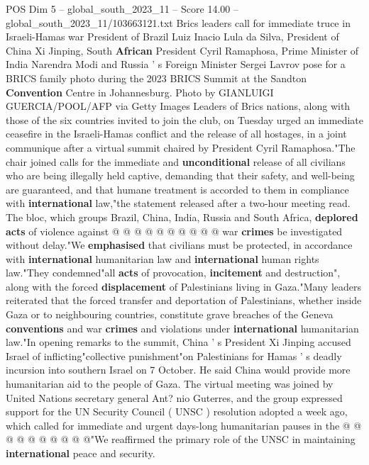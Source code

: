 \begin{textsample}{POS Dim 5 – global\_south\_2023\_11 – Score 14.00 – global\_south\_2023\_11/103663121.txt}  \label{ex:f5_pos_273}
Brics leaders call for immediate truce in Israeli-Hamas war President of Brazil Luiz Inacio Lula da Silva, President of China Xi Jinping, South \textbf{African} President Cyril Ramaphosa, Prime Minister of India Narendra Modi and Russia ' s Foreign Minister Sergei Lavrov pose for a BRICS family photo during the 2023 BRICS Summit at the Sandton \textbf{Convention} Centre in Johannesburg.
Photo by GIANLUIGI GUERCIA/POOL/AFP via Getty Images Leaders of Brics nations, along with those of the six countries invited to join the club, on Tuesday urged an immediate ceasefire in the Israeli-Hamas conflict and the release of all hostages, in a joint communique after a virtual summit chaired by President Cyril Ramaphosa."The chair joined calls for the immediate and \textbf{unconditional} release of all civilians who are being illegally held captive, demanding that their safety, and well-being are guaranteed, and that humane treatment is accorded to them in compliance with \textbf{international} law,"the statement released after a two-hour meeting read.
The bloc, which groups Brazil, China, India, Russia and South Africa, \textbf{deplored} \textbf{acts} of violence against @ @ @ @ @ @ @ @ @ @ war \textbf{crimes} be investigated without delay."We \textbf{emphasised} that civilians must be protected, in accordance with \textbf{international} humanitarian law and \textbf{international} human rights law."They condemned"all \textbf{acts} of provocation, \textbf{incitement} and destruction", along with the forced \textbf{displacement} of Palestinians living in Gaza."Many leaders reiterated that the forced transfer and deportation of Palestinians, whether inside Gaza or to neighbouring countries, constitute grave breaches of the Geneva \textbf{conventions} and war \textbf{crimes} and violations under \textbf{international} humanitarian law."In opening remarks to the summit, China ' s President Xi Jinping accused Israel of inflicting"collective punishment"on Palestinians for Hamas ' s deadly incursion into southern Israel on 7 October.
He said China would provide more humanitarian aid to the people of Gaza.
The virtual meeting was joined by United Nations secretary general Ant? nio Guterres, and the group expressed support for the UN Security Council ( UNSC ) resolution adopted a week ago, which called for immediate and urgent days-long humanitarian pauses in the @ @ @ @ @ @ @ @ @ @"We reaffirmed the primary role of the UNSC in maintaining \textbf{international} peace and security.

\end{textsample}
